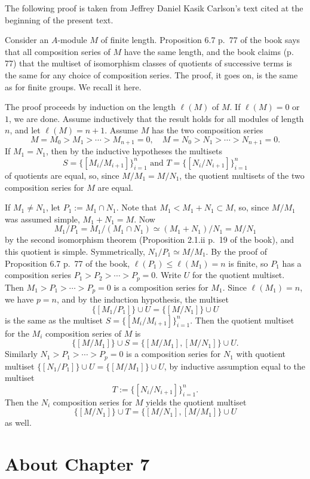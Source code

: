 \documentclass[parskip=half,fontsize=12pt]{scrartcl}%
\begin{document}
The following proof is taken from Jeffrey Daniel Kasik Carlson's text cited at the beginning of the present text. 

Consider an $A$-module $M$ of finite length. Proposition 6.7 p.~77 of the book says that all composition series of $M$ have the same length, and the book claims (p. 77) that the multiset of isomorphism classes of quotients of successive terms is the same for any choice of composition series. The proof, it goes on, is the same as for finite groups. We recall it here.

The proof proceeds by induction on the length $\ell(M)$ of $M$. If $\ell(M)=0$ or $1$, we are done. Assume inductively that the result holds for all modules of length $n$, and let $\ell(M)=n+1$. Assume $M$ has the two composition series 
$$
M=M_0>M_1>\cdots>M_{n+1}=0,\quad M=N_0>N_1>\cdots>N_{n+1}=0.
$$
If $M_1=N_1$, then by the inductive hypotheses the multisets 
$$
S=\{[M_i/M_{i+1}]\}_{i=1}^n\text{ and }T=\{[N_i/N_{i+1}]\}_{i=1}^n
$$ 
of quotients are equal, so, since $M/M_1=M/N_1$, the quotient multisets of the two composition series for $M$ are equal.

If $M_1\ne N_1$, let $P_1:=M_1\cap N_1$. Note that $M_1<M_1+N_1\subset M$, so, since $M/M_1$ was assumed simple, $M_1+N_1=M$. Now 
$$
M_1/P_1 = M_1/(M_1\cap N_1)\simeq(M_1+N_1)/N_1=M/N_1
$$ 
by the second isomorphism theorem (Proposition 2.1.ii p.~19 of the book), and this quotient is simple. Symmetrically, $N_1/P_1\simeq M/M_1$. By the proof of Proposition 6.7 p.~77 of the book, $\ell(P_1)\le\ell(M_1)=n$ is finite, so $P_1$ has a composition series $P_1>P_2>\cdots>P_p=0$. Write $U$ for the quotient multiset. Then $M_1>P_1>\cdots>P_p=0$ is a composition series for $M_1$. Since $\ell(M_1)=n$, we have $p = n$, and by the induction hypothesis, the multiset  
$$
\{[M_1/P_1]\}\cup U =\{[M/N_1]\}\cup U
$$ 
is the same as the multiset $S=\{[M_i/M_{i+1}]\}_{i=1}^n$. Then the quotient multiset for the $M_i$ composition series of $M$ is 
$$
\{[M/M_1]\}\cup S=\{[M/M_1],[M/N_1]\}\cup U.
$$ 
Similarly $N_1>P_1>\cdots>P_p=0$ is a composition series for $N_1$ with quotient multiset $\{[N_1/P_1]\}\cup U=\{[M/M_1]\}\cup U$, by inductive assumption equal to the multiset 
$$
T:=\{[N_i/N_{i+1}]\}_{i=1}^n.
$$ 
Then the $N_i$ composition series for $M$ yields the quotient multiset 
$$
\{[M/N_1]\}\cup T=\{[M/N_1],[M/M_1]\}\cup U
$$ 
as well.

\section{About Chapter 7}%
\end{document}
